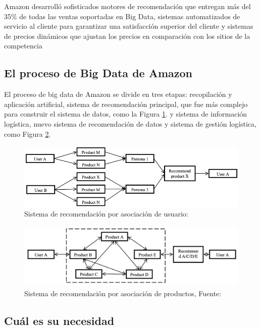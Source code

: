 Amazon desarrolló sofisticados motores de recomendación que entregan más del 35\% de todas las ventas soportadas en Big Data, sistemas automatizados de servicio al cliente para garantizar una satisfacción superior del cliente y sistemas de precios dinámicos que ajustan los precios en comparación con los sitios de la competencia 

\subsection{El proceso de Big Data de Amazon}

El proceso de big data  de Amazon se divide en tres etapas: recopilación y aplicación artificial, sistema de recomendación principal, que fue más complejo para construir el sistema de datos, como la Figura \ref{fig:4}. y sistema de información logística, nuevo sistema de recomendación de datos y sistema de gestión logística, como Figura \ref{fig:5}.

\begin{figure}[h]
	\centering
	\includegraphics[scale=.5] {img/recomendation-system}
	\caption{Sistema de recomendación por asociación de usuario: }
	\label{fig:4}	
\end{figure}

\begin{figure}[h]
	\centering
	\includegraphics[scale=.3] {img/asocacion_productos}
	\caption{Sistema de recomendación por asociación de productos, Fuente: }
	\label{fig:5}	
\end{figure}


\subsection{Cuál es su necesidad}

